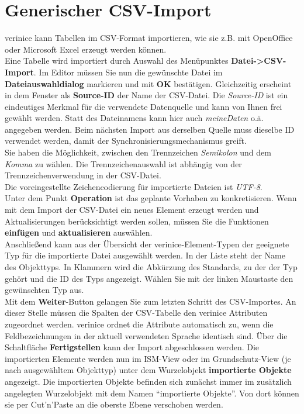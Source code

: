 \documentclass[a4paper,10pt]{book}
\begin{document}
\section{Generischer CSV-Import} \label{Generischer CSV-Import}
verinice kann Tabellen im CSV-Format importieren, wie sie z.B. mit OpenOffice oder Microsoft Excel erzeugt werden können.
\newline\\
Eine Tabelle wird importiert durch Auswahl des Menüpunktes \textbf{Datei-\textgreater CSV-Import}. Im Editor müssen Sie nun die gewünschte Datei im
\textbf{Dateiauswahldialog} markieren und mit \textbf{ OK} bestätigen.
Gleichzeitig erscheint in dem Fenster als \textbf{Source-ID} der Name der CSV-Datei. Die \textit{Source-ID} ist ein eindeutiges Merkmal für die verwendete
Datenquelle und kann von Ihnen frei gewählt werden. Statt des Dateinamens kann hier auch \textit{meineDaten} o.ä. angegeben werden.
Beim nächsten Import aus derselben Quelle muss dieselbe ID verwendet werden, damit der Synchronisierungsmechanismus greift.
\newline\\
Sie haben die Möglichkeit, zwischen den Trennzeichen \textit{Semikolon} und dem \textit{Komma} zu wählen. Die Trennzeichenauswahl ist
abhängig von der Trennzeichenverwendung in der CSV-Datei.
\newline\\
Die voreingestellte Zeichencodierung für importierte Dateien ist \textit{UTF-8}.
\newline\\
Unter dem Punkt \textbf{Operation} ist das geplante Vorhaben zu konkretisieren. Wenn mit dem Import der CSV-Datei ein neues Element erzeugt
werden und Aktualisierungen berücksichtigt werden sollen, müssen Sie die Funktionen \textbf{einfügen} und \textbf{aktualisieren} auswählen.
\newline\\
Anschließend kann aus der Übersicht der verinice-Element-Typen der geeignete Typ für die importierte Datei ausgewählt werden. In der Liste steht der Name des Objekttyps. In Klammern wird die Abkürzung des Standards, zu der der Typ gehört und die ID des Typs angezeigt. Wählen Sie mit der linken Maustaste den gewünschten Typ aus.
\newline\\
Mit dem \textbf{Weiter}-Button gelangen Sie zum letzten Schritt des CSV-Importes. An dieser Stelle müssen die Spalten der CSV-Tabelle den verinice
Attributen zugeordnet werden. verinice ordnet die Attribute automatisch zu, wenn die Feldbezeichnungen in der aktuell verwendeten Sprache identisch
sind. Über die Schaltfläche \textbf{Fertigstellen} kann der Import abgeschlossen werden.
Die importierten Elemente werden nun im ISM-View oder im Grundschutz-View (je nach ausgewähltem Objekttyp) unter dem Wurzelobjekt
\textbf{importierte Objekte} angezeigt.
Die importierten Objekte befinden sich zunächst immer im zusätzlich angelegten Wurzelobjekt mit dem Namen ``importierte Objekte''.
Von dort können sie per Cut'n'Paste an die oberste Ebene verschoben werden.
\end{document}
